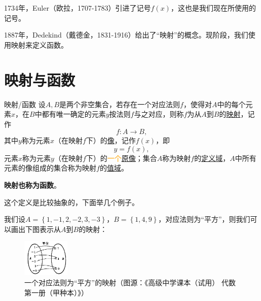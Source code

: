 \documentclass[lang=cn,math=cm,chinesefont=nofont,11pt,scheme=chinese,onecol]{elegantbook}
\begin{document}
1734年，Euler（欧拉，1707-1783）引进了记号$f(x)$，这也是我们现在所使用的记号。

1887年，Dedekind（戴德金，1831-1916）给出了“映射”的概念。现阶段，我们使用映射来定义函数。

\section{映射与函数}

\begin{definition}{映射/函数}
  设$A,B$是两个非空集合，若存在一个对应法则$f$，使得对$A$中的每个元素$x$，在$B$中都有唯一确定的元素$y$按法则$f$与之对应，则称$f$为从$A$到$B$的\underline{映射}，记作$$f:A\rightarrow B,$$其中$y$称为元素$x$（在映射$f$下）的\underline{像}，记作$f(x)$，即$$y=f(x),$$元素$x$称为元素$y$（在映射$f$下）的\textcolor{orange}{一个}\underline{原像}；集合$A$称为映射$f$的\underline{定义域}，$A$中所有元素的像组成的集合称为映射$f$的\underline{值域}。

  \textbf{映射也称为函数}。
\end{definition}

这个定义是比较抽象的，下面举几个例子。

\begin{example}
  我们设$A=\left\{1,-1,2,-2,3,-3\right\}$，$B=\left\{1,4,9\right\}$，对应法则为“平方”，则我们可以画出下图表示从$A$到$B$的映射：
\end{example}

\begin{figure}[h]
  \centering
  \includegraphics[width=0.2\textwidth]{image/map2.1.1.png}
  \caption{一个对应法则为“平方”的映射（图源：《高级中学课本（试用） 代数 第一册（甲种本）》）}
  \label{img:proposition}
\end{figure}

\begin{example}
  
\end{example}
\end{document}
